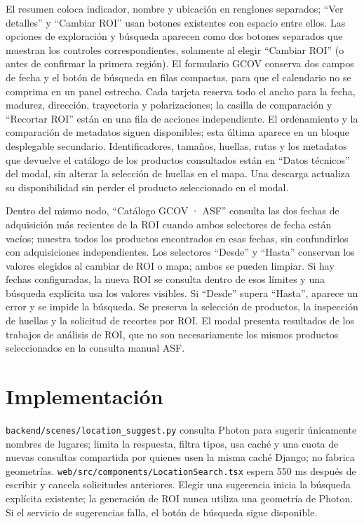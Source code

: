 \documentclass[11pt]{article}
\begin{document}
El resumen coloca indicador, nombre y ubicación en renglones separados; ``Ver detalles'' y ``Cambiar ROI'' usan botones existentes con espacio entre ellos. Las opciones de exploración y búsqueda aparecen como dos botones separados que muestran los controles correspondientes, solamente al elegir ``Cambiar ROI'' (o antes de confirmar la primera región). El formulario GCOV conserva dos campos de fecha y el botón de búsqueda en filas compactas, para que el calendario no se comprima en un panel estrecho. Cada tarjeta reserva todo el ancho para la fecha, madurez, dirección, trayectoria y polarizaciones; la casilla de comparación y ``Recortar ROI'' están en una fila de acciones independiente. El ordenamiento y la comparación de metadatos siguen disponibles; esta última aparece en un bloque desplegable secundario. Identificadores, tamaños, huellas, rutas y los metadatos que devuelve el catálogo de los productos consultados están en ``Datos técnicos'' del modal, sin alterar la selección de huellas en el mapa. Una descarga actualiza su disponibilidad sin perder el producto seleccionado en el modal.

Dentro del mismo nodo, ``Catálogo GCOV · ASF'' consulta las dos fechas de adquisición más recientes de la ROI cuando ambos selectores de fecha están vacíos; muestra todos los productos encontrados en esas fechas, sin confundirlos con adquisiciones independientes. Los selectores ``Desde'' y ``Hasta'' conservan los valores elegidos al cambiar de ROI o mapa; ambos se pueden limpiar. Si hay fechas configuradas, la nueva ROI se consulta dentro de esos límites y una búsqueda explícita usa los valores visibles. Si ``Desde'' supera ``Hasta'', aparece un error y se impide la búsqueda. Se preserva la selección de productos, la inspección de huellas y la solicitud de recortes por ROI. El modal presenta resultados de los trabajos de análisis de ROI, que no son necesariamente los mismos productos seleccionados en la consulta manual ASF.

\section{Implementación}
\texttt{backend/scenes/location\_suggest.py} consulta Photon para sugerir únicamente nombres de lugares; limita la respuesta, filtra tipos, usa caché y una cuota de nuevas consultas compartida por quienes usen la misma caché Django; no fabrica geometrías. \texttt{web/src/components/LocationSearch.tsx} espera 550 ms después de escribir y cancela solicitudes anteriores. Elegir una sugerencia inicia la búsqueda explícita existente; la generación de ROI nunca utiliza una geometría de Photon. Si el servicio de sugerencias falla, el botón de búsqueda sigue disponible.
\end{document}
